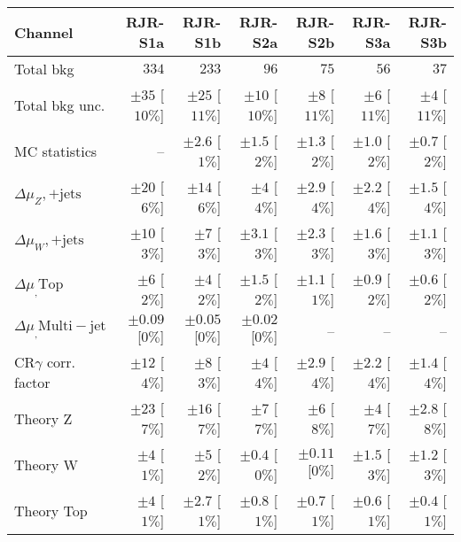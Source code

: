 \clearpage

\begin{table}[H]
\scriptsize
\begin{center}
\begin{tabular}{|lrrrrrr|}
\hline
Channel  &  \textbf{ RJR-S1a } & \textbf{ RJR-S1b } & \textbf{ RJR-S2a } & \textbf{ RJR-S2b } & \textbf{ RJR-S3a } & \textbf{ RJR-S3b }  \\ \hline
Total bkg  &  $334$  &  $233$  &  $96$  &  $75$  &  $56$  &  $37$ \\
Total bkg unc.  &  $\pm 35$  [$10\%$]  &  $\pm 25$  [$11\%$]  &  $\pm 10$  [$10\%$]  &  $\pm 8$  [$11\%$]  &  $\pm 6$  [$11\%$]  &  $\pm 4$  [$11\%$] \\
\hline
MC statistics  &   --    &  $\pm 2.6$ [$1\%$]  &  $\pm 1.5$ [$2\%$]  &  $\pm 1.3$ [$2\%$]  &  $\pm 1.0$ [$2\%$]  &  $\pm 0.7$ [$2\%$] \\
$\Delta\mu_Z,\mathrm{+jets}$  &  $\pm 20$ [$6\%$]  &  $\pm 14$ [$6\%$]  &  $\pm 4$ [$4\%$]  &  $\pm 2.9$ [$4\%$]  &  $\pm 2.2$ [$4\%$]  &  $\pm 1.5$ [$4\%$] \\
$\Delta\mu_W,\mathrm{+jets}$ &  $\pm 10$ [$3\%$]  &  $\pm 7$ [$3\%$]  &  $\pm 3.1$ [$3\%$]  &  $\pm 2.3$ [$3\%$]  &  $\pm 1.6$ [$3\%$]  &  $\pm 1.1$ [$3\%$] \\
$\Delta\mu_,\mathrm{ Top}$  &  $\pm 6$ [$2\%$]  &  $\pm 4$ [$2\%$]  &  $\pm 1.5$ [$2\%$]  &  $\pm 1.1$ [$1\%$]  &  $\pm 0.9$ [$2\%$]  &  $\pm 0.6$ [$2\%$] \\
$\Delta\mu_,\mathrm{ Multi-jet}$  &  $\pm 0.09$ [$0\%$]  &  $\pm 0.05$ [$0\%$]  &  $\pm 0.02$ [$0\%$]  &   --    &   --    &   --   \\
CR$\gamma$ corr. factor  &  $\pm 12$ [$4\%$]  &  $\pm 8$ [$3\%$]  &  $\pm 4$ [$4\%$]  &  $\pm 2.9$ [$4\%$]  &  $\pm 2.2$ [$4\%$]  &  $\pm 1.4$ [$4\%$] \\
Theory Z  &  $\pm 23$ [$7\%$]  &  $\pm 16$ [$7\%$]  &  $\pm 7$ [$7\%$]  &  $\pm 6$ [$8\%$]  &  $\pm 4$ [$7\%$]  &  $\pm 2.8$ [$8\%$] \\
Theory W  &  $\pm 4$ [$1\%$]  &  $\pm 5$ [$2\%$]  &  $\pm 0.4$ [$0\%$]  &  $\pm 0.11$ [$0\%$]  &  $\pm 1.5$ [$3\%$]  &  $\pm 1.2$ [$3\%$] \\
Theory Top   &  $\pm 4$ [$1\%$]  &  $\pm 2.7$ [$1\%$]  &  $\pm 0.8$ [$1\%$]  &  $\pm 0.7$ [$1\%$]  &  $\pm 0.6$ [$1\%$]  &  $\pm 0.4$ [$1\%$] \\

\end{tabular}
\end{center}
\end{table}
